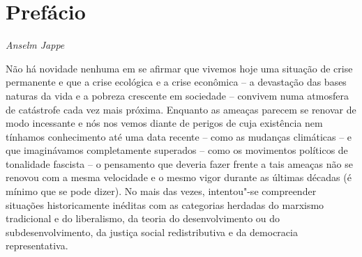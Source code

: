 

\chapter{Prefácio}


\begin{flushright}
\emph{Anselm Jappe}
\end{flushright}

Não há novidade nenhuma em se afirmar que vivemos hoje uma situação de
crise permanente e que a crise ecológica e a crise econômica -- a
devastação das bases naturas da vida e a pobreza crescente em sociedade
-- convivem numa atmosfera de catástrofe cada vez mais próxima. Enquanto
as ameaças parecem se renovar de modo incessante e nós nos vemos diante
de perigos de cuja existência nem tínhamos conhecimento até uma data
recente -- como as mudanças climáticas -- e que imaginávamos
completamente superados -- como os movimentos políticos de tonalidade
fascista -- o pensamento que deveria fazer frente a tais ameaças não se
renovou com a mesma velocidade e o mesmo vigor durante as últimas
décadas (é mínimo que se pode dizer). No mais das vezes, intentou"-se
compreender situações historicamente inéditas com as categorias herdadas
do marxismo tradicional e do liberalismo, da teoria do desenvolvimento
ou do subdesenvolvimento, da justiça social redistributiva e da
democracia representativa.

